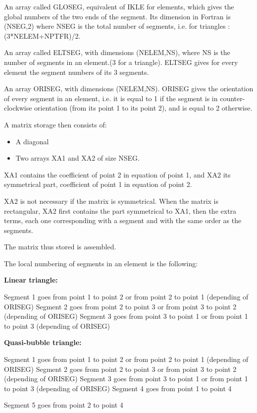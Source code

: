 An array called GLOSEG, equivalent of IKLE for elements, which gives the global
numbers of the two ends of the segment. Its dimension in Fortran is (NSEG,2)
where NSEG is the total number of segments, i.e. for triangles :
(3*NELEM+NPTFR)/2.

An array called ELTSEG, with dimensions (NELEM,NS), where NS is the number of
segments in an element.(3 for a triangle). ELTSEG gives for every element the
segment numbers of its 3 segments.

An array ORISEG, with dimensions (NELEM,NS). ORISEG gives the orientation of
every segment in an element, i.e. it is equal to 1 if the segment is in
counter-clockwise orientation (from its point 1 to its point 2), and is equal
to 2 otherwise.

A matrix storage then consists of:
\begin{itemize}
  \item A diagonal
  \item Two arrays XA1 and XA2 of size NSEG.
\end{itemize}

XA1 contains the coefficient of point 2 in equation of point 1, and XA2 its
symmetrical part, coefficient of point 1 in equation of point 2.

XA2 is not necessary if the matrix is symmetrical. When the matrix is
rectangular, XA2 first contains the part symmetrical to XA1, then the extra
terms, each one corresponding with a segment and with the same order as the
segments.

The matrix thus stored is assembled.

The local numbering of segments in an element is the following:

\textbf{Linear triangle:}

Segment 1 goes from point 1 to point 2 or from point 2 to point 1 (depending of ORISEG)
Segment 2 goes from point 2 to point 3 or from point 3 to point 2 (depending of ORISEG)
Segment 3 goes from point 3 to point 1 or from point 1 to point 3 (depending of ORISEG)

\textbf{Quasi-bubble triangle:}

Segment 1 goes from point 1 to point 2 or from point 2 to point 1 (depending of ORISEG)
Segment 2 goes from point 2 to point 3 or from point 3 to point 2 (depending of ORISEG)
Segment 3 goes from point 3 to point 1 or from point 1 to point 3 (depending of ORISEG)
Segment 4 goes from point 1 to point 4

Segment 5 goes from point 2 to point 4

